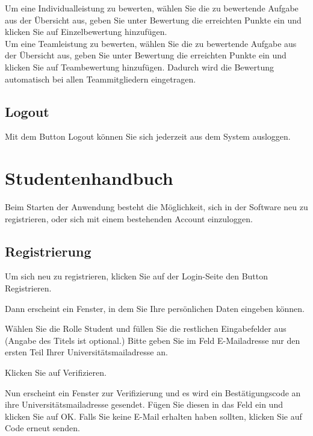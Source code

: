 \documentclass{Handbuch}
\begin{document}
Um eine Individualleistung zu bewerten, wählen Sie die zu bewertende Aufgabe aus der Übersicht aus, geben Sie unter \glqq Bewertung\grqq{} die erreichten Punkte ein und klicken Sie auf \frqq Einzelbewertung hinzufügen\flqq.\\
Um eine Teamleistung zu bewerten, wählen Sie die zu bewertende Aufgabe aus der Übersicht aus, geben Sie unter \glqq Bewertung\grqq{} die erreichten Punkte ein und klicken Sie auf \frqq Teambewertung hinzufügen\flqq. Dadurch wird die Bewertung automatisch bei allen Teammitgliedern eingetragen. 


\subsection{Logout}
Mit dem Button \frqq Logout\flqq{} können Sie sich jederzeit aus dem System ausloggen.


\newpage
\section{Studentenhandbuch}
Beim Starten der Anwendung besteht die Möglichkeit, sich in der Software neu zu registrieren, oder sich mit einem bestehenden Account einzuloggen.

\subsection{Registrierung}
Um sich neu zu registrieren, klicken Sie auf der Login-Seite den Button \frqq Registrieren\flqq{}. 
\begin{center}
\end{center}
Dann erscheint ein Fenster, in dem Sie Ihre persönlichen Daten eingeben können. 
\begin{center}
\end{center}
Wählen Sie die Rolle \glqq Student\grqq{} und füllen Sie die restlichen Eingabefelder aus (Angabe des Titels ist optional.) Bitte geben Sie im Feld \glqq E-Mailadresse\grqq{} nur den ersten Teil Ihrer Universitätsmailadresse an.
\begin{center}
\end{center}
Klicken Sie auf \frqq Verifizieren\flqq. 
\begin{center}
\end{center}
Nun erscheint ein Fenster zur Verifizierung und es wird ein Bestätigungscode an ihre Universitätsmailadresse gesendet. Fügen Sie diesen in das Feld ein und klicken Sie auf \frqq OK\flqq.
Falls Sie keine E-Mail erhalten haben sollten, klicken Sie auf \frqq Code erneut senden\flqq. 
\end{document}
